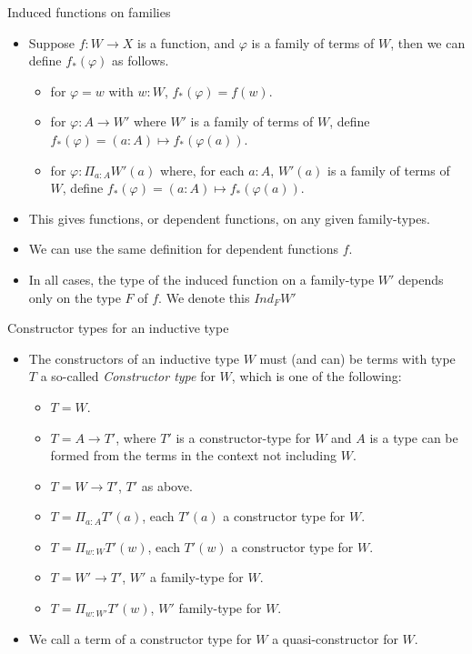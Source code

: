 \documentclass[10 pt., handout]{beamer}
\theoremstyle{plain}
\theoremstyle{remark}
\begin{document}
\begin{frame}{Induced functions on families}

\begin{itemize}

\item Suppose $f: W \to X$ is a function, and $\varphi$ is a family of terms of $W$, then we can define $f_*(\varphi)$ as follows.
\begin{itemize}
\item for $\varphi = w$ with $w : W$, $f_*(\varphi) = f(w)$.
\item for $\varphi : A \to W'$ where $W'$ is a family of terms of $W$, define $f_*(\varphi) = (a : A) \mapsto f_*(\varphi(a))$.
\item for $\varphi : \Pi_{a : A} W'(a)$ where, for each $a : A$, $W'(a)$ is a family of terms of $W$, define $f_*(\varphi) = (a : A) \mapsto f_*(\varphi(a))$.
\end{itemize}

\item This gives functions, or dependent functions, on any given family-types.

\item We can use the same definition for dependent functions $f$. 

\item In all cases, the type of the induced function on a family-type $W'$ depends only on the type $F$ of $f$. We denote this $Ind_F W'$

\end{itemize}

\end{frame}


\begin{frame}{Constructor types for an inductive type}

\begin{itemize}

\item The constructors of an inductive type $W$ must (and can) be terms with type $T$ a so-called \emph{Constructor type} for $W$, which is one of the following:
\begin{itemize}
\item $T = W$.
\item $T = A \to T'$, where $T'$ is a constructor-type for $W$ and $A$ is a type can be formed from the terms in the context not including $W$.
\item $T = W \to T'$, $T'$ as above.
\item $T = \Pi_{a : A} T'(a)$, each $T'(a)$ a constructor type for $W$.
\item $T = \Pi_{w : W} T'(w)$, each $T'(w)$ a constructor type for $W$.
\item $T = W' \to T'$, $W'$ a family-type for $W$.
\item $T = \Pi_{w : W'} T'(w)$, $W'$ family-type for $W$.
\end{itemize}

\item We call a term of a constructor type for $W$ a quasi-constructor for $W$.

\end{itemize}

\end{frame}
\end{document}
